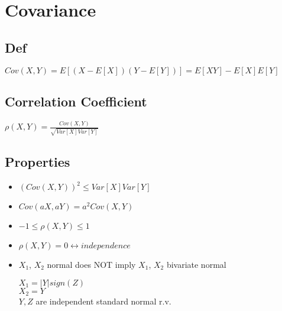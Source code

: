 \section{Covariance}

\subsection*{Def}
    $Cov(X, Y) = E[(X-E[X])(Y-E[Y])] = E[XY] - E[X]E[Y]$

\subsection*{Correlation Coefficient}
    $\rho(X, Y) = \frac{Cov(X, Y)}{\sqrt{Var[X]Var[Y]}}$

\subsection*{Properties}
    \begin{itemize}
        \item $(Cov(X, Y))^2 \leq Var[X]Var[Y]$
        \item $Cov(aX,aY) = a^2Cov(X,Y)$
        \item $-1 \leq \rho(X, Y) \leq 1$
        \item $\rho(X, Y) = 0 \leftrightarrow independence$
        \item $X_1$, $X_2$ normal does NOT imply $X_1$, $X_2$ bivariate normal
        
        $X_1 = |Y|sign(Z)$\\
        $X_2 = Y$\\
        $Y, Z$ are independent standard normal r.v.
    \end{itemize}
    

    